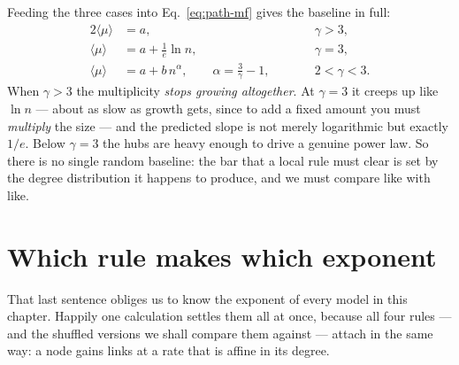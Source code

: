 Feeding the three cases into Eq.~\eqref{eq:path-mf} gives the baseline in full:
\begin{alignat}{2}
  \langle\mu\rangle &= a, &&\qquad \gamma>3,
  \label{eq:path-const}\\
  \langle\mu\rangle &= a + \tfrac{1}{e}\ln n, &&\qquad \gamma=3,
  \label{eq:path-log}\\
  \langle\mu\rangle &= a + b\,n^{\alpha}, \qquad \alpha = \tfrac{3}{\gamma}-1,
    &&\qquad 2<\gamma<3.
  \label{eq:path-power}
\end{alignat}
When $\gamma>3$ the multiplicity \emph{stops growing altogether}. At $\gamma=3$ it
creeps up like $\ln n$ --- about as slow as growth gets, since to add a fixed amount
you must \emph{multiply} the size --- and the predicted slope is not merely
logarithmic but exactly $1/e$. Below $\gamma=3$ the hubs are heavy enough to drive
a genuine power law. So there is no single random baseline: the bar that a local
rule must clear is set by the degree distribution it happens to produce, and we
must compare like with like.

\section{Which rule makes which exponent}

That last sentence obliges us to know the exponent of every model in this chapter.
Happily one calculation settles them all at once, because all four rules --- and
the shuffled versions we shall compare them against --- attach in the same way: a
node gains links at a rate that is affine in its degree.

